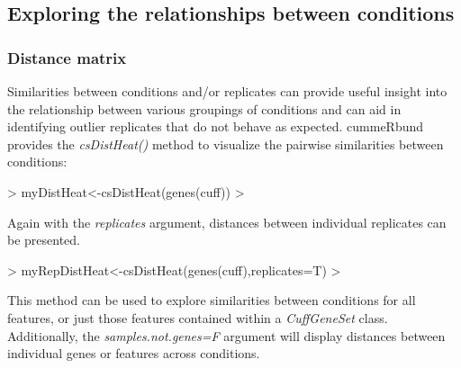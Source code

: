 \documentclass[10pt]{article}
\newcommand{\Rclass}[1]{{\textit{#1}}}
\newcommand{\Rmethod}[1]{{\textit{#1}}}
\newcommand{\Rfunarg}[1]{{\textit{#1}}}
\begin{document}
\subsection{Exploring the relationships between conditions}

\subsubsection{Distance matrix}
Similarities between conditions and/or replicates can
provide useful insight into the relationship between various groupings of
conditions and can aid in identifying outlier replicates that do not behave as
expected. cummeRbund provides the \Rmethod{csDistHeat()} method to visualize the
pairwise similarities between conditions:

\begin{Schunk}
\begin{Sinput}
> myDistHeat<-csDistHeat(genes(cuff))
> 
\end{Sinput}
\end{Schunk}

\begin{figure}[htp]
	\begin{center}
	
	\end{center}
\end{figure}

Again with the \Rfunarg{replicates} argument, distances between individual
replicates can be presented.

\begin{Schunk}
\begin{Sinput}
> myRepDistHeat<-csDistHeat(genes(cuff),replicates=T)
> 
\end{Sinput}
\end{Schunk}

\begin{figure}[htp]
	\begin{center}
	
	\end{center}
\end{figure}

This method can be used to explore similarities between conditions for all
features, or just those features contained within a \Rclass{CuffGeneSet} class. 
Additionally, the \Rfunarg{samples.not.genes=F} argument will display distances
between individual genes or features across conditions.
\end{document}

